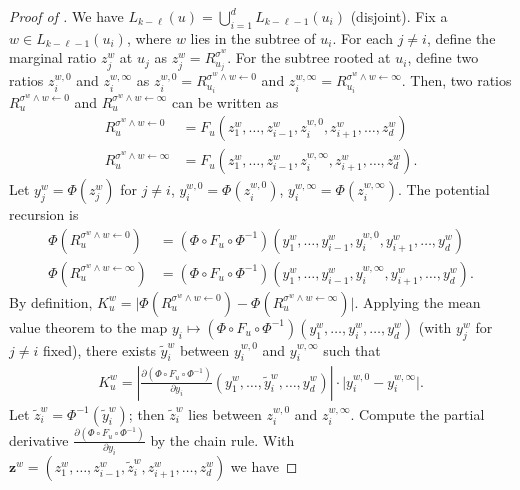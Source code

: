 \documentclass[11pt]{amsart}
\theoremstyle{definition}
\theoremstyle{remark}
\begin{document}
\begin{proof}[Proof of ]
    We have $L_{k-\ell}(u) = \bigcup_{i=1}^d L_{k-\ell-1}(u_i)$ (disjoint). Fix a $w \in L_{k-\ell-1}(u_i)$, where $w$ lies in the subtree of $u_i$. For each $j \neq i$, define the marginal ratio $z_j^w$ at $u_j$ as $z_j^w = R_{u_j}^{\sigma^w}$. For the subtree rooted at $u_i$, define two ratios $z_i^{w,0}$ and $z_i^{w,\infty}$ as $z_i^{w,0} = R_{u_i}^{\sigma^w \land w \gets 0}$ and $z_i^{w,\infty} = R_{u_i}^{\sigma^w \land w \gets \infty}$. Then, two ratios $R_u^{\sigma^w \land w \gets 0}$ and $R_u^{\sigma^w \land w \gets \infty}$ can be written as
    \begin{align*}
    R_u^{\sigma^w \land w \gets 0} &= F_u(z_1^w, \ldots, z_{i-1}^w, z_i^{w,0}, z_{i+1}^w, \ldots, z_d^w)\\
    R_u^{\sigma^w \land w \gets \infty} &= F_u(z_1^w, \ldots, z_{i-1}^w, z_i^{w,\infty}, z_{i+1}^w, \ldots, z_d^w).
    \end{align*}
    Let $y_j^w = \Phi(z_j^w)$ for $j \neq i$, $y_i^{w,0} = \Phi(z_i^{w,0})$, $y_i^{w,\infty} = \Phi(z_i^{w,\infty})$. The potential recursion is
    \begin{align*}
    \Phi(R_u^{\sigma^w \land w \gets 0}) &= (\Phi\circ F_u \circ \Phi^{-1})(y_1^w, \ldots, y_{i-1}^w, y_i^{w,0}, y_{i+1}^w, \ldots, y_d^w)\\
    \Phi(R_u^{\sigma^w \land w \gets \infty}) &= (\Phi\circ F_u \circ \Phi^{-1})(y_1^w, \ldots, y_{i-1}^w, y_i^{w,\infty}, y_{i+1}^w, \ldots, y_d^w).
    \end{align*}
    By definition, $K_u^w = \bigl| \Phi(R_u^{\sigma^w \land w \gets 0}) - \Phi(R_u^{\sigma^w \land w \gets \infty}) \bigr|$. Applying the mean value theorem to the map $y_i \mapsto (\Phi\circ F_u\circ \Phi^{-1})(y_1^w,\ldots,y_i^w,\ldots,y_d^w)$ (with $y_j^w$ for $j \neq i$ fixed), there exists $\tilde{y}_i^w$ between $y_i^{w,0}$ and $y_i^{w,\infty}$ such that
\begin{align*}
K_u^w = \left | \frac{\partial (\Phi\circ F_u\circ \Phi^{-1})}{\partial y_i}(y_1^w,\ldots,\tilde{y}_i^w,\ldots,y_d^w) \right | \cdot \bigl| y_i^{w,0} - y_i^{w,\infty} \bigr|.
\end{align*}
Let $\tilde{z}_i^w = \Phi^{-1}(\tilde{y}_i^w)$; then $\tilde{z}_i^w$ lies between $z_i^{w,0}$ and $z_i^{w,\infty}$. Compute the partial derivative $\frac{\partial (\Phi\circ F_u\circ \Phi^{-1})}{\partial y_i}$ by the chain rule. With $\boldsymbol{z}^w = (z_1^w,\ldots,z_{i-1}^w,\tilde{z}_i^w,z_{i+1}^w,\ldots,z_d^w)$ we have

\end{proof}
\end{document}
